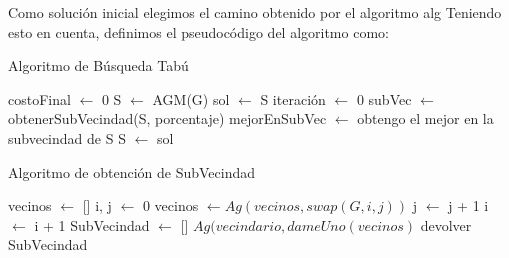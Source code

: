 \documentclass[10pt,a4paper]{article}
\begin{document}
Como solución inicial elegimos el camino obtenido por el algoritmo {alg}
Teniendo esto en cuenta, definimos el pseudocódigo del algoritmo como:

\begin{algorithm}[H]
\caption{Algoritmo de Búsqueda Tabú}
\begin{algorithmic}[1]
\State costoFinal $\gets$ 0
    \State S $\gets$ AGM(G)
    \State sol $\gets$ S
    \State iteración $\gets$ 0
     \label{lst:line:tabuiteracion}
        \State subVec $\gets$ obtenerSubVecindad(S, porcentaje)   \label{lst:line:tabuvecindad}
        \State mejorEnSubVec $\gets$ obtengo el mejor en la subvecindad de S    \label{lst:line:tabumejor}
            \State S $\gets$ sol   \label{lst:line:tabuaspiracion}
        \EndIf
    \EndWhile
\EndFunction
\end{algorithmic}
\label{alg:TABU}
\end{algorithm}

\begin{algorithm}[H]
\caption{Algoritmo de obtención de SubVecindad}
\begin{algorithmic}[1]
    \State vecinos $\gets$ []
    \State i, j $\gets$ 0
            \State vecinos $\gets Ag(vecinos, swap(G, i, j))$
            \State j $\gets$ j + 1
        \EndWhile
        \State i $\gets$ i + 1
    \EndWhile
    \State SubVecindad $\gets$ []
        \State $Ag(vecindario, dameUno(vecinos)$
    \EndWhile
    \State devolver SubVecindad
\EndFunction
\end{algorithmic}
\end{algorithm}
\end{document}
